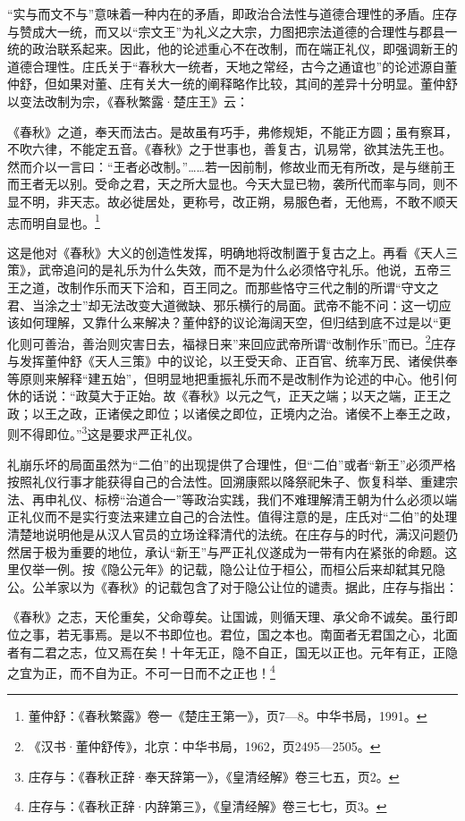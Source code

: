 \documentclass[a4paper, 12pt, openright]{ctexbook}
\renewenvironment{quote}
  {\list{}{\rightmargin2\ccwd \leftmargin2\ccwd \itemindent=2\ccwd \listparindent=2\ccwd}%
   \item\relax\small\kaishu\color{black}}
  {\endlist}
\begin{document}
“实与而文不与”意味着一种内在的矛盾，即政治合法性与道德合理性的矛盾。庄存与赞成大一统，而又以“宗文王”为礼义之大宗，力图把宗法道德的合理性与郡县一统的政治联系起来。因此，他的论述重心不在改制，而在端正礼仪，即强调新王的道德合理性。庄氏关于“春秋大一统者，天地之常经，古今之通谊也”的论述源自董仲舒，但如果对董、庄有关大一统的阐释略作比较，其间的差异十分明显。董仲舒以变法改制为宗，《春秋繁露·楚庄王》云：

\begin{quote}
《春秋》之道，奉天而法古。是故虽有巧手，弗修规矩，不能正方圆；虽有察耳，不吹六律，不能定五音。《春秋》之于世事也，善复古，讥易常，欲其法先王也。然而介以一言曰：“王者必改制。”……若一因前制，修故业而无有所改，是与继前王而王者无以别。受命之君，天之所大显也。今天大显已物，袭所代而率与同，则不显不明，非天志。故必徙居处，更称号，改正朔，易服色者，无他焉，不敢不顺天志而明自显也。\footnote{董仲舒：《春秋繁露》卷一《楚庄王第一》，页7—8。中华书局，1991。}
\end{quote}

这是他对《春秋》大义的创造性发挥，明确地将改制置于复古之上。再看《天人三策》，武帝追问的是礼乐为什么失效，而不是为什么必须恪守礼乐。他说，五帝三王之道，改制作乐而天下洽和，百王同之。而那些恪守三代之制的所谓“守文之君、当涂之士”却无法改变大道微缺、邪乐横行的局面。武帝不能不问：这一切应该如何理解，又靠什么来解决？董仲舒的议论海阔天空，但归结到底不过是以“更化则可善治，善治则灾害日去，福禄日来”来回应武帝所谓“改制作乐”而已。\footnote{《汉书·董仲舒传》，北京：中华书局，1962，页2495—2505。}庄存与发挥董仲舒《天人三策》中的议论，以王受天命、正百官、统率万民、诸侯供奉等原则来解释“建五始”，但明显地把重振礼乐而不是改制作为论述的中心。他引何休的话说：“政莫大于正始。故《春秋》以元之气，正天之端；以天之端，正王之政；以王之政，正诸侯之即位；以诸侯之即位，正境内之治。诸侯不上奉王之政，则不得即位。”\footnote{庄存与：《春秋正辞·奉天辞第一》，《皇清经解》卷三七五，页2。}这是要求严正礼仪。

礼崩乐坏的局面虽然为“二伯”的出现提供了合理性，但“二伯”或者“新王”必须严格按照礼仪行事才能获得自己的合法性。回溯康熙以降祭祀朱子、恢复科举、重建宗法、再申礼仪、标榜“治道合一”等政治实践，我们不难理解清王朝为什么必须以端正礼仪而不是实行变法来建立自己的合法性。值得注意的是，庄氏对“二伯”的处理清楚地说明他是从汉人官员的立场诠释清代的法统。在庄存与的时代，满汉问题仍然居于极为重要的地位，承认“新王”与严正礼仪遂成为一带有内在紧张的命题。这里仅举一例。按《隐公元年》的记载，隐公让位于桓公，而桓公后来却弑其兄隐公。公羊家以为《春秋》的记载包含了对于隐公让位的谴责。据此，庄存与指出：

\begin{quote}
《春秋》之志，天伦重矣，父命尊矣。让国诚，则循天理、承父命不诚矣。虽行即位之事，若无事焉。是以不书即位也。君位，国之本也。南面者无君国之心，北面者有二君之志，位又焉在矣！十年无正，隐不自正，国无以正也。元年有正，正隐之宜为正，而不自为正。不可一日而不之正也！\footnote{庄存与：《春秋正辞·内辞第三》，《皇清经解》卷三七七，页3。}
\end{quote}
\end{document}
